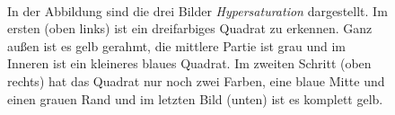 \documentclass[11pt]{article}
\begin{document}
\begin{figure}[H]
\\ 
\makebox[0.25\textwidth][c]{}
\caption{In der Abbildung sind die drei Bilder \textit{Hypersaturation} dargestellt. Im ersten (oben links) ist ein dreifarbiges Quadrat zu erkennen. Ganz außen ist es gelb gerahmt, die mittlere Partie ist grau und im Inneren ist ein kleineres blaues Quadrat. Im zweiten Schritt (oben rechts) hat das Quadrat nur noch zwei Farben, eine blaue Mitte und einen grauen Rand und im letzten Bild (unten) ist es komplett gelb.}
\label{hypersat}
\end{figure}
\end{document}
